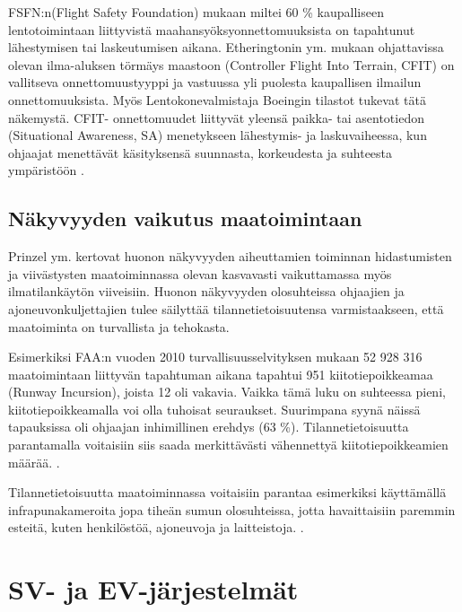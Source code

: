 \documentclass[utf8,bachelor,manualbib]{gradu3}
\begin{document}
FSFN:n(Flight Safety Foundation) mukaan miltei 60 \% kaupalliseen lentotoimintaan liittyvistä maahansyöksyonnettomuuksista on tapahtunut lähestymisen tai laskeutumisen aikana. Etheringtonin ym. \citeyearpar{etherington2000} mukaan ohjattavissa olevan ilma-aluksen törmäys maastoon (Controller Flight Into Terrain, CFIT) on vallitseva onnettomuustyyppi ja vastuussa yli puolesta kaupallisen ilmailun onnettomuuksista. Myös Lentokonevalmistaja Boeingin \citeyearpar{boeing1996} tilastot tukevat tätä näkemystä. CFIT- onnettomuudet liittyvät yleensä paikka- tai asentotiedon (Situational Awareness, SA) menetykseen lähestymis- ja laskuvaiheessa, kun ohjaajat menettävät käsityksensä suunnasta, korkeudesta ja suhteesta ympäristöön \cite{schnellym2004}.

\section{Näkyvyyden vaikutus maatoimintaan}

Prinzel ym. \citeyearpar{prinzel2013} kertovat huonon näkyvyyden aiheuttamien toiminnan hidastumisten ja viivästysten maatoiminnassa olevan kasvavasti vaikuttamassa myös ilmatilankäytön viiveisiin. Huonon näkyvyyden olosuhteissa ohjaajien ja ajoneuvonkuljettajien tulee säilyttää tilannetietoisuutensa varmistaakseen, että maatoiminta on turvallista ja tehokasta.

Esimerkiksi FAA:n vuoden 2010 turvallisuusselvityksen mukaan 52 928 316 maatoimintaan liittyvän tapahtuman aikana tapahtui 951 kiitotiepoikkeamaa (Runway Incursion), joista 12 oli vakavia. Vaikka tämä luku on suhteessa pieni, kiitotiepoikkeamalla voi olla tuhoisat seuraukset. Suurimpana syynä näissä tapauksissa oli ohjaajan inhimillinen erehdys (63 \%). Tilannetietoisuutta parantamalla voitaisiin siis saada merkittävästi vähennettyä kiitotiepoikkeamien määrää. \citep{prinzel2013}.

Tilannetietoisuutta maatoiminnassa voitaisiin parantaa esimerkiksi käyttämällä infrapunakameroita jopa tiheän sumun olosuhteissa, jotta havaittaisiin paremmin esteitä, kuten henkilöstöä, ajoneuvoja ja laitteistoja. \citep{beiergemperlein2004}.













\chapter{SV- ja EV-järjestelmät}
\end{document}
